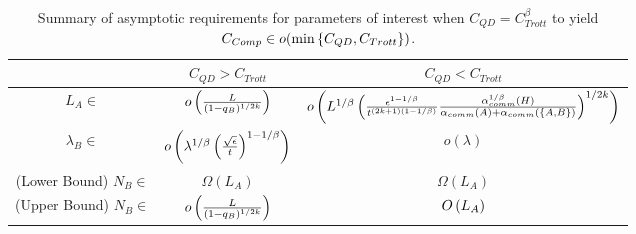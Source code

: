 \begin{table}[h!]
\centering
\begin{tabular}{|c||c|c|}
    \hline
    & $C_{QD} > C_{Trott}$ & $C_{QD} < C_{Trott}$ \\
    \hline \hline
    $L_A \in$ & $o\left( \frac{L}{(1-q_B)^{1/2k}} \right)$ & $o\left(  L^{1/\beta} \left( \frac{\epsilon^{1-1/\beta}}{t^{(2k+1)(1-1/\beta)}} \frac{\alpha_{comm}^{1/\beta}(H)}{\alpha_{comm}(A) + \alpha_{comm}(\left\{ A,B \right\})}  \right)^{1/2k} \right)$ \\
    \hline $\lambda_B \in$ & $o \left( \lambda^{1/\beta} \left( \frac{\sqrt{\epsilon}}{t} \right)^{1-1/\beta} \right)$ & $ o(\lambda)$ \\
    \hline (Lower Bound) $N_B \in$ & $\Omega(L_A)$ & $\Omega(L_A)$ \\
    \hline (Upper Bound) $N_B \in$ & $o\left( \frac{L}{(1-q_B)^{1/2k}} \right)$ & $O\left( L_A \right)$ \\
    \hline
\end{tabular}
\caption{Summary of asymptotic requirements for parameters of interest when $C_{QD} = C_{Trott}^{\beta}$ to yield $C_{Comp} \in o(\min \left\{ C_{QD}, C_{Trott} \right\})$.}
\end{table}

